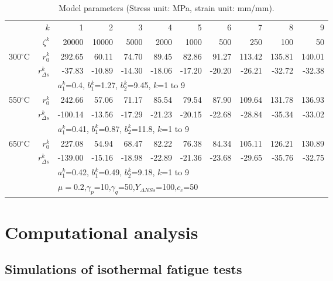 \documentclass[preprint,5p,twocolumn,11pt,sort&compress]{elsarticle}
\begin{document}
\begin{table*}[htbp]
  \centering
  \caption{Model parameters (Stress unit: MPa, strain unit: mm/mm).}
    \begin{tabular}{rrrrrrrrrrr}
    \hline
          & $k$   & 1     & 2     & 3     & 4     & 5     & 6     & 7     & 8     & 9 \\
          & $\zeta^k$ & 20000 & 10000 & 5000  & 2000  & 1000  & 500   & 250   & 100   & 50 \\
    \hline
    300$^{\circ}$C & $r_0^k$ & 292.65  & 60.11  & 74.70  & 89.45  & 82.86  & 91.27  & 113.42  & 135.81  & 140.01  \\
          & $r_{\Delta s}^k$ & -37.83  & -10.89  & -14.30  & -18.06  & -17.20  & -20.20  & -26.21  & -32.72  & -32.38  \\
          & & \multicolumn{9}{l}{$a_1^k$=0.4, $b_1^k$=1.27, $b_2^k$=9.45, $k$=1 to 9} \\
    \hline
    550$^{\circ}$C & $r_0^k$ & 242.66  & 57.06  & 71.17  & 85.54  & 79.54  & 87.90  & 109.64  & 131.78  & 136.93  \\
          & $r_{\Delta s}^k$ & -100.14  & -13.56  & -17.29  & -21.23  & -20.15  & -22.68  & -28.84  & -35.34  & -33.02  \\
          & & \multicolumn{9}{l}{$a_1^k$=0.41, $b_1^k$=0.87, $b_2^k$=11.8, $k$=1 to 9} \\
    \hline
    650$^{\circ}$C & $r_0^k$ & 227.08  & 54.94  & 68.47  & 82.22  & 76.38  & 84.34  & 105.11  & 126.21  & 130.89  \\
          & $r_{\Delta s}^k$ & -139.00  & -15.16  & -18.98  & -22.89  & -21.36  & -23.68  & -29.65  & -35.76  & -32.75  \\
          & & \multicolumn{9}{l}{$a_1^k$=0.42, $b_1^k$=0.49, $b_2^k$=9.18, $k$=1 to 9} \\
    \hline
          & & \multicolumn{9}{l}{$\mu=0.2$,$\gamma_p$=10,$\gamma_q$=50,$Y_{\Delta NSs}$=100,$c_c$=50} \\
    \hline
    \end{tabular}%
  \label{tab:3}%
\end{table*}%

\section{Computational analysis}

\subsection{Simulations of isothermal fatigue tests}
\end{document}
